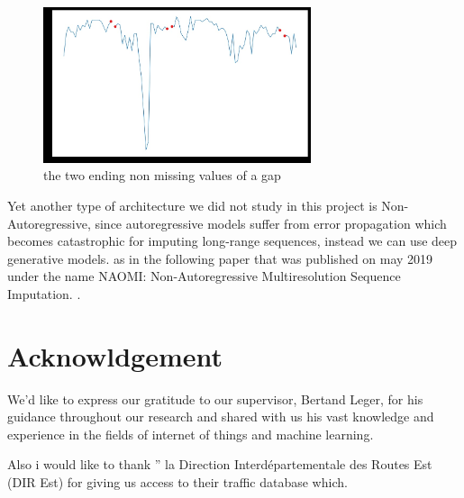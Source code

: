 \begin{figure}[h]
\centering
\includegraphics[width=0.7\textwidth]{img/extrapoalting.jpg}
\caption{the two ending non missing values of a gap}
\label{fig:extrapo}
\end{figure}

Yet another type of architecture we did not study in this project is Non-Autoregressive, since  autoregressive models  suffer from error propagation which becomes catastrophic for imputing long-range sequences, instead we can use  deep generative models. as in the following paper that was published on may 2019 under the name NAOMI: Non-Autoregressive Multiresolution
Sequence Imputation. \cite{naomi}.




\section{Acknowldgement}

We'd like to express our gratitude to our supervisor, Bertand Leger, for his guidance  throughout our research and shared with us his vast knowledge and
experience in the fields of internet of things and machine learning.

Also i would like to thank   '' la Direction Interdépartementale des Routes Est (DIR Est) for giving us access to their traffic database which. 


